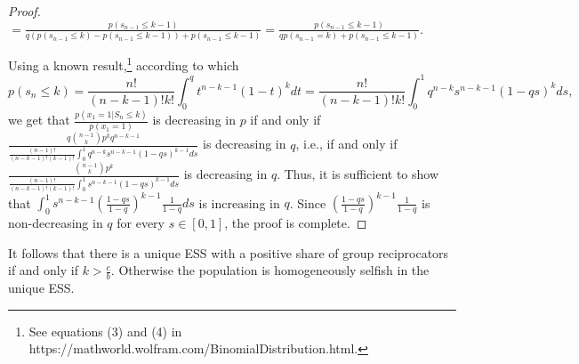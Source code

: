 \documentclass[12pt,a4paper]{article}
\begin{document}
\begin{proof}
\vspace{0.3cm}
$=\frac{p(s_{n-1} \leq k-1)}{q(p(s_{n-1} \leq k)-p(s_{n-1} \leq k-1))+p(s_{n-1} \leq k-1)}=\frac{p(s_{n-1} \leq k-1)}{qp(s_{n-1}=k)+p(s_{n-1} \leq k-1)}.$
\vspace{0.3cm}

Using a known result,\footnote{See equations (3) and (4) in https://mathworld.wolfram.com/BinomialDistribution.html.} according to which
\begin{equation*}
    p(s_n \leq k) = \frac{n!}{(n-k-1)!k!}\int_0^q t^{n-k-1}(1-t)^k dt = \frac{n!}{(n-k-1)!k!}\int_0^1 q^{n-k} s^{n-k-1} (1-qs)^k ds,
\end{equation*}
we get that $\frac{p(x_1=1|S_n \leq k)}{p(x_1=1)}$ is decreasing in $p$ if and only if $\frac{q \binom{n-1}{k} p^k q^{n-k-1}}{\frac{(n-1)!}{(n-k-1)!(k-1)!}\int_0^1 q^{n-k}s^{n-k-1}(1-qs)^{k-1} ds}$ is decreasing in $q$, i.e., if and only if $\frac{\binom{n-1}{k} p^k}{\frac{(n-1)!}{(n-k-1)!(k-1)!}\int_0^1 s^{n-k-1}(1-qs)^{k-1} ds}$ is decreasing in $q$.
\vspace{0.3cm}
Thus, it is sufficient to show that $\int_0^1 s^{n-k-1}(\frac{1-qs}{1-q})^{k-1}\frac{1}{1-q} ds$ is increasing in $q$. Since $(\frac{1-qs}{1-q})^{k-1}\frac{1}{1-q}$ is non-decreasing in $q$ for every $s \in [0,1]$, the proof is complete.

\end{proof}
%
It follows that there is a unique ESS with a positive share of group
reciprocators if and only if $k > \frac{c}{b}$. Otherwise the population is homogeneously selfish in the unique ESS.
\end{document}
